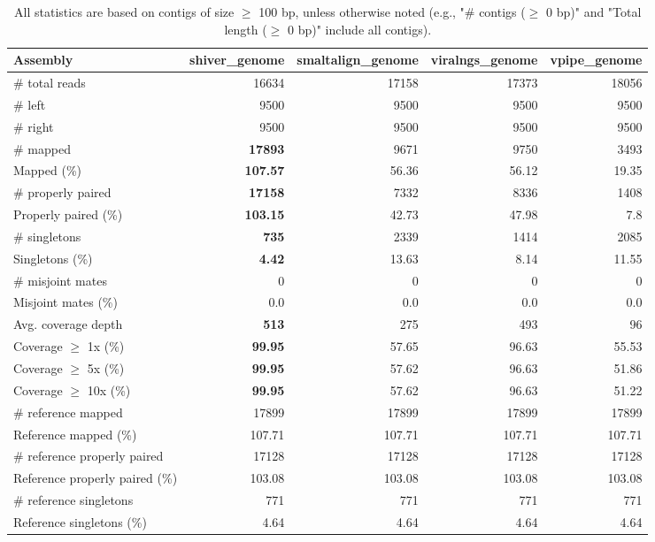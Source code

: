 \documentclass[12pt,a4paper]{article}
\begin{document}
\begin{table}[ht]
\begin{center}
\caption{All statistics are based on contigs of size $\geq$ 100 bp, unless otherwise noted (e.g., "\# contigs ($\geq$ 0 bp)" and "Total length ($\geq$ 0 bp)" include all contigs).}
\begin{tabular}{|l*{4}{|r}|}
\hline
Assembly & shiver\_genome & smaltalign\_genome & viralngs\_genome & vpipe\_genome \\ \hline
\# total reads & 16634 & 17158 & 17373 & 18056 \\ \hline
\# left & 9500 & 9500 & 9500 & 9500 \\ \hline
\# right & 9500 & 9500 & 9500 & 9500 \\ \hline
\# mapped & {\bf 17893} & 9671 & 9750 & 3493 \\ \hline
Mapped (\%) & {\bf 107.57} & 56.36 & 56.12 & 19.35 \\ \hline
\# properly paired & {\bf 17158} & 7332 & 8336 & 1408 \\ \hline
Properly paired (\%) & {\bf 103.15} & 42.73 & 47.98 & 7.8 \\ \hline
\# singletons & {\bf 735} & 2339 & 1414 & 2085 \\ \hline
Singletons (\%) & {\bf 4.42} & 13.63 & 8.14 & 11.55 \\ \hline
\# misjoint mates & 0 & 0 & 0 & 0 \\ \hline
Misjoint mates (\%) & 0.0 & 0.0 & 0.0 & 0.0 \\ \hline
Avg. coverage depth & {\bf 513} & 275 & 493 & 96 \\ \hline
Coverage $\geq$ 1x (\%) & {\bf 99.95} & 57.65 & 96.63 & 55.53 \\ \hline
Coverage $\geq$ 5x (\%) & {\bf 99.95} & 57.62 & 96.63 & 51.86 \\ \hline
Coverage $\geq$ 10x (\%) & {\bf 99.95} & 57.62 & 96.63 & 51.22 \\ \hline
\# reference mapped & 17899 & 17899 & 17899 & 17899 \\ \hline
Reference mapped (\%) & 107.71 & 107.71 & 107.71 & 107.71 \\ \hline
\# reference properly paired & 17128 & 17128 & 17128 & 17128 \\ \hline
Reference properly paired (\%) & 103.08 & 103.08 & 103.08 & 103.08 \\ \hline
\# reference singletons & 771 & 771 & 771 & 771 \\ \hline
Reference singletons (\%) & 4.64 & 4.64 & 4.64 & 4.64 \\ \hline

\end{tabular}
\end{center}
\end{table}
\end{document}
